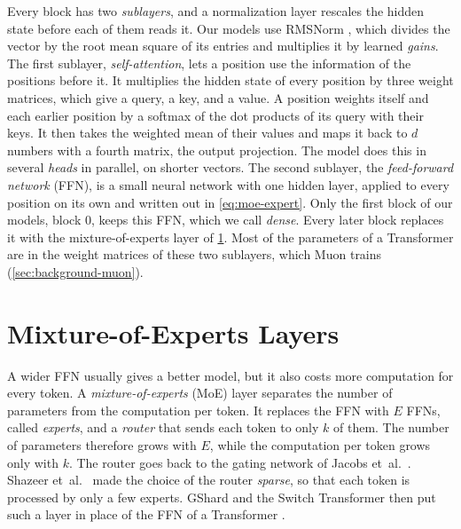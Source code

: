 Every block has two \emph{sublayers}, and a normalization layer rescales the hidden state before each of them reads it. Our models use RMSNorm \cite{zhang2019rmsnorm}, which divides the vector by the root mean square of its entries and multiplies it by learned \emph{gains}. The first sublayer, \emph{self-attention}, lets a position use the information of the positions before it. It multiplies the hidden state of every position by three weight matrices, which give a query, a key, and a value. A position weights itself and each earlier position by a softmax of the dot products of its query with their keys. It then takes the weighted mean of their values and maps it back to $d$ numbers with a fourth matrix, the output projection. The model does this in several \emph{heads} in parallel, on shorter vectors. The second sublayer, the \emph{feed-forward network} (FFN), is a small neural network with one hidden layer, applied to every position on its own and written out in \cref{eq:moe-expert}. Only the first block of our models, block 0, keeps this FFN, which we call \emph{dense}. Every later block replaces it with the mixture-of-experts layer of \cref{sec:background-moe}. Most of the parameters of a Transformer are in the weight matrices of these two sublayers, which Muon trains (\cref{sec:background-muon}).

\section{Mixture-of-Experts Layers}
\label{sec:background-moe}
A wider FFN usually gives a better model, but it also costs more computation for every token. A \emph{mixture-of-experts} (MoE) layer separates the number of parameters from the computation per token. It replaces the FFN with $E$ FFNs, called \emph{experts}, and a \emph{router} that sends each token to only $k$ of them. The number of parameters therefore grows with $E$, while the computation per token grows only with $k$. The router goes back to the gating network of Jacobs et~al.~\cite{jacobs1991adaptive}. Shazeer et~al.~\cite{shazeer2017outrageously} made the choice of the router \emph{sparse}, so that each token is processed by only a few experts. GShard and the Switch Transformer then put such a layer in place of the FFN of a Transformer \cite{lepikhin2021gshard, fedus2022switch}.

